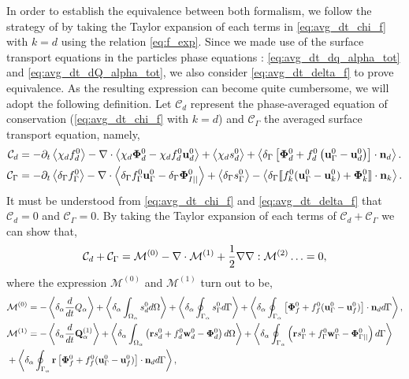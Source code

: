 In order to establish the equivalence between both formalism, we follow the strategy of \citep{lhuillier2000bilan,lhuillier2009rheology} by taking the Taylor expansion of each terms in \ref{eq:avg_dt_chi_f} with $k=d$ using the relation \ref{eq:f_exp}. 
Since we made use of the surface transport equations in the particles phase equations : \ref{eq:avg_dt_dq_alpha_tot} and \ref{eq:avg_dt_dQ_alpha_tot}, we also consider \ref{eq:avg_dt_delta_f} to prove equivalence. 
As the resulting expression can become quite cumbersome, we will adopt the following definition. 
Let $\mathcal{C}_d$ represent the phase-averaged equation of conservation (\ref{eq:avg_dt_chi_f} with $k=d$) and $\mathcal{C}_\Gamma $ the averaged surface transport equation, namely, 
\begin{align*}
    \mathcal{C}_d
    &=
    - \partial_t \left<\chi_df_d^0\right>
    - \mathbf{\nabla}\cdot \left<\chi_d \mathbf{\Phi}_d^0 - \chi_df_d^0 \textbf{u}_d^0\right>
    + \left<\chi_d s_d^0\right>
    + \left<\delta_\Gamma \left[
        \mathbf{\Phi}_d^0
        + f_d^0
        \left(
            \textbf{u}_\Gamma ^0
            - \textbf{u}_d^0
        \right)
    \right]
    \cdot \textbf{n}_d\right>.\\
    \mathcal{C}_\Gamma 
    &= 
    -\partial_t \left<\delta_\Gamma f_\Gamma ^0\right>
    -\mathbf{\nabla}\cdot \left<\delta_\Gamma  f_\Gamma ^0 \textbf{u}_\Gamma ^0-\delta_\Gamma  \mathbf{\Phi}_{I||}^0 \right>
    + \left<\delta_\Gamma s_\Gamma ^0\right> 
    - \left<\delta_\Gamma  \llbracket 
    f_k^0 (\textbf{u}_\Gamma ^0 - \textbf{u}_k^0)
    + \mathbf{\Phi}_k^0
     \rrbracket \cdot \textbf{n}_k \right>. 
\end{align*}
It must be understood from \ref{eq:avg_dt_chi_f} and \ref{eq:avg_dt_delta_f} that $\mathcal{C}_d=0$ and $\mathcal{C}_\Gamma =0$.
By taking the Taylor expansion of each terms of $\mathcal{C}_d+\mathcal{C}_\Gamma $ we can show that,
\begin{equation}
    \mathcal{C}_d 
    + \mathcal{C}_\Gamma  
    = \mathcal{M}^{(0)} - \mathbf{\nabla}\cdot \mathcal{M}^{(1)} + \frac{1}{2} \mathbf{\nabla}\mathbf{\nabla} : \mathcal{M}^{(2)} \ldots = 0,
    \label{eq:scheme_equivalence}
\end{equation} 
where the expression $\mathcal{M}^{(0)}$ and $\mathcal{M}^{(1)}$ turn out to be, 
\begin{align*}
    &\mathcal{M}^{(0)}
    = 
    - \left<\delta_\alpha \frac{d}{dt} {Q_\alpha}\right>
    + \left<\delta_\alpha \int_{\Omega_{\alpha}}  s_d^0  d\Omega\right>
    + \left<\delta_\alpha \oint_{\Gamma_{\alpha}}  s_\Gamma ^0  d\Gamma\right>
    + \left<\delta_\alpha \oint_{\Gamma_{\alpha}}  
    \left[\mathbf{\Phi}_f^0 
    + f_f^0 (\textbf{u}_\Gamma ^0-\textbf{u}_f^0) \right] \cdot \textbf{n}_d  d\Gamma\right>,\\
    &\mathcal{M}^{(1)} =
    -  \left<\delta_\alpha \frac{d}{dt} {\textbf{Q}_\alpha^{(1)}}\right>
     + \left<\delta_\alpha \int_{\Omega_{\alpha}}  \left(
        \textbf{r} s_d^0         
        + f_d^0  \textbf{w}_d^0 
        - \mathbf{\Phi}_d^0
    \right)  d\Omega\right>
    + \left<\delta_\alpha \oint_{\Gamma_{\alpha}}  \left(
        \textbf{r}s_\Gamma ^0
        + f_\Gamma ^0 \textbf{w}_\Gamma ^0
        - \mathbf{\Phi}_{\Gamma||}^0
    \right)  d\Gamma\right>\\
    &+ \left<\delta_\alpha \oint_{\Gamma_{\alpha}}  \textbf{r} \left[
        \mathbf{\Phi}_f^0
        + f_f^0 (\textbf{u}_\Gamma ^0-\textbf{u}_f^0)
    \right]\cdot \textbf{n}_d   d\Gamma\right>,
\end{align*}
